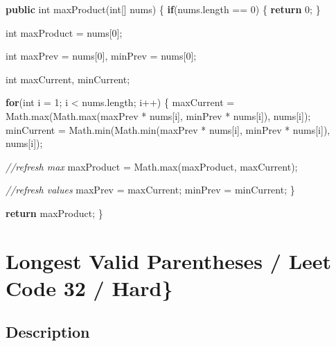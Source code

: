 \documentclass[]{book}
\newenvironment{Shaded}{\begin{snugshade}}{\end{snugshade}}
\newcommand{\BuiltInTok}[1]{#1}
\newcommand{\CommentTok}[1]{\textcolor[rgb]{0.56,0.35,0.01}{\textit{#1}}}
\newcommand{\DataTypeTok}[1]{\textcolor[rgb]{0.13,0.29,0.53}{#1}}
\newcommand{\DecValTok}[1]{\textcolor[rgb]{0.00,0.00,0.81}{#1}}
\newcommand{\FunctionTok}[1]{\textcolor[rgb]{0.00,0.00,0.00}{#1}}
\newcommand{\KeywordTok}[1]{\textcolor[rgb]{0.13,0.29,0.53}{\textbf{#1}}}
\newcommand{\NormalTok}[1]{#1}
\begin{document}
\begin{Shaded}
\begin{Highlighting}[]
\KeywordTok{public} \DataTypeTok{int} \FunctionTok{maxProduct}\NormalTok{(}\DataTypeTok{int}\NormalTok{[] nums) \{}
    \KeywordTok{if}\NormalTok{(nums.}\FunctionTok{length}\NormalTok{ == }\DecValTok{0}\NormalTok{) \{}
        \KeywordTok{return} \DecValTok{0}\NormalTok{;}
\NormalTok{    \}}

    \DataTypeTok{int}\NormalTok{ maxProduct = nums[}\DecValTok{0}\NormalTok{];}

    \DataTypeTok{int}\NormalTok{ maxPrev = nums[}\DecValTok{0}\NormalTok{], minPrev = nums[}\DecValTok{0}\NormalTok{];}

    \DataTypeTok{int}\NormalTok{ maxCurrent, minCurrent;}

    \KeywordTok{for}\NormalTok{(}\DataTypeTok{int}\NormalTok{ i = }\DecValTok{1}\NormalTok{; i < nums.}\FunctionTok{length}\NormalTok{; i++) \{}
\NormalTok{        maxCurrent = }\BuiltInTok{Math}\NormalTok{.}\FunctionTok{max}\NormalTok{(}\BuiltInTok{Math}\NormalTok{.}\FunctionTok{max}\NormalTok{(maxPrev * nums[i], minPrev * nums[i]), nums[i]);}
\NormalTok{        minCurrent = }\BuiltInTok{Math}\NormalTok{.}\FunctionTok{min}\NormalTok{(}\BuiltInTok{Math}\NormalTok{.}\FunctionTok{min}\NormalTok{(maxPrev * nums[i], minPrev * nums[i]), nums[i]);}

        \CommentTok{//refresh max}
\NormalTok{        maxProduct = }\BuiltInTok{Math}\NormalTok{.}\FunctionTok{max}\NormalTok{(maxProduct, maxCurrent);}

        \CommentTok{//refresh values}
\NormalTok{        maxPrev = maxCurrent;}
\NormalTok{        minPrev = minCurrent;}
\NormalTok{    \}}

    \KeywordTok{return}\NormalTok{ maxProduct;}
\NormalTok{\}}
\end{Highlighting}
\end{Shaded}

\hypertarget{longest-valid-parentheses-leet-code-32-hard}{%
\section{Longest Valid Parentheses / Leet Code 32 / Hard\}}\label{longest-valid-parentheses-leet-code-32-hard}}

\hypertarget{description-28}{%
\subsection{Description}\label{description-28}}
\end{document}
